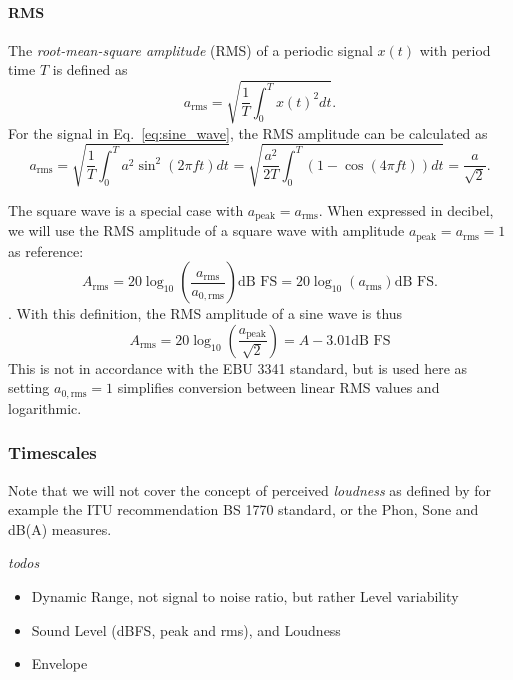 \documentclass[../main2.tex]{subfiles}
\begin{document}
\paragraph{RMS}
The \emph{root-mean-square amplitude} (RMS) of a periodic signal $x(t)$ with period time $T$ is defined as
\begin{equation}
a_\text{rms} = \sqrt{ \frac{1}{T} \int_{0}^{T} x(t)^2 dt }.
\end{equation}
For the signal in Eq.~\eqref{eq:sine_wave}, the RMS amplitude can be calculated as
\begin{equation}
a_\text{rms} =
\sqrt{ \frac{1}{T} \int_{0}^{T} a^2 \sin^2 (2 \pi f t) dt } =
\sqrt{ \frac{a^2}{2T} \int_{0}^{T}\left( 1 - \cos (4 \pi f t) \right) dt } =
\frac{a}{\sqrt 2}.
\end{equation}

The square wave is a special case with $a_\text{peak} = a_\text{rms}$. When expressed in decibel, we will use the RMS amplitude of a square wave with amplitude $a_\text{peak} = a_\text{rms} = 1$ as reference:
\begin{equation}
A_\text{rms} =
20 \log_{10} \left( \frac{a_\text{rms}}{a_{0, \text{rms}}} \right) \text{dB FS} =
20 \log_{10} \left( a_\text{rms} \right) \text{dB FS}.
\end{equation}.
With this definition, the RMS amplitude of a sine wave is thus
\begin{equation}
A_\text{rms} = 20\log_{10} \left( \frac{a_\text{peak}}{\sqrt 2} \right) = A - 3.01 \text{dB FS}
\end{equation}
This is not in accordance with the EBU 3341 standard, but is used here as setting $a_{0, \text{rms}} = 1$ simplifies conversion between linear RMS values and logarithmic.

\subsubsection{Timescales}
Note that we will not cover the concept of perceived \emph{loudness} as defined by for example the ITU recommendation BS 1770 standard, or the Phon, Sone and dB(A) measures.

\emph{todos}
\begin{itemize}
	\item Dynamic Range, not signal to noise ratio, but rather Level variability
	\item Sound Level (dBFS, peak and rms), and Loudness
	\item Envelope
\end{itemize}
\end{document}

